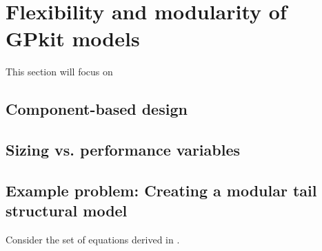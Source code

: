 \chapter{Flexibility and modularity of GPkit models}

This section will focus on

\section{Component-based design}

\section{Sizing vs. performance variables}

\section{Example problem: Creating a modular tail structural model}

Consider the set of equations derived in \cite{gp_ac_design}.